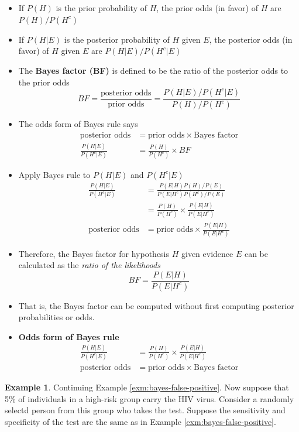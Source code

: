 \documentclass[
]{book}
\providecommand{\tightlist}{%
  \setlength{\itemsep}{0pt}\setlength{\parskip}{0pt}}
\theoremstyle{definition}
\theoremstyle{definition}
\newtheorem{example}{Example}[chapter]
\theoremstyle{definition}
\theoremstyle{remark}
\begin{document}
\begin{itemize}
\tightlist
\item
  If \(P(H)\) is the prior probability of \(H\), the prior odds (in favor) of \(H\) are \(P(H)/P(H^c)\)
\item
  If \(P(H|E)\) is the posterior probability of \(H\) given \(E\), the posterior odds (in favor) of \(H\) given \(E\) are \(P(H|E)/P(H^c|E)\)
\item
  The \textbf{Bayes factor (BF)} is defined to be the ratio of the posterior odds to the prior odds
  \[
  BF = \frac{\text{posterior odds}}{\text{prior odds}} = \frac{P(H|E)/P(H^c|E)}{P(H)/P(H^c)}
  \]
\item
  The odds form of Bayes rule says
  \begin{align*}
  \text{posterior odds} & = \text{prior odds} \times \text{Bayes factor}\\
  \frac{P(H|E)}{P(H^c|E)} & = \frac{P(H)}{P(H^c)} \times BF
  \end{align*}
\item
  Apply Bayes rule to \(P(H|E)\) and \(P(H^c|E)\)
  \begin{align*}
  \frac{P(H|E)}{P(H^c|E)} & = \frac{P(E|H)P(H)/P(E)}{P(E|H^c)P(H^c)/P(E)}\\
  & =  \frac{P(H)}{P(H^c)} \times \frac{P(E|H)}{P(E|H^c)}\\
  \text{posterior odds} & = \text{prior odds} \times \frac{P(E|H)}{P(E|H^c)}
  \end{align*}
\item
  Therefore, the Bayes factor for hypothesis \(H\) given evidence \(E\) can be calculated as the \emph{ratio of the likelihoods}
  \[
  BF = \frac{P(E|H)}{P(E|H^c)}
  \]
\item
  That is, the Bayes factor can be computed without first computing posterior probabilities or odds.
\item
  \textbf{Odds form of Bayes rule}
  \begin{align*}
  \frac{P(H|E)}{P(H^c|E)} & =  \frac{P(H)}{P(H^c)} \times \frac{P(E|H)}{P(E|H^c)}
  \\
  \text{posterior odds} & = \text{prior odds} \times \text{Bayes factor}
  \end{align*}
\end{itemize}

\begin{example}
\protect\hypertarget{exm:bayes-false-positive-odds2}{}{\label{exm:bayes-false-positive-odds2} }
Continuing Example \ref{exm:bayes-false-positive}. Now suppose that 5\% of individuals in a high-risk group carry the HIV virus. Consider a randomly selectd person from this group who takes the test. Suppose the sensitivity and specificity of the test are the same as in Example \ref{exm:bayes-false-positive}.
\end{example}
\end{document}
